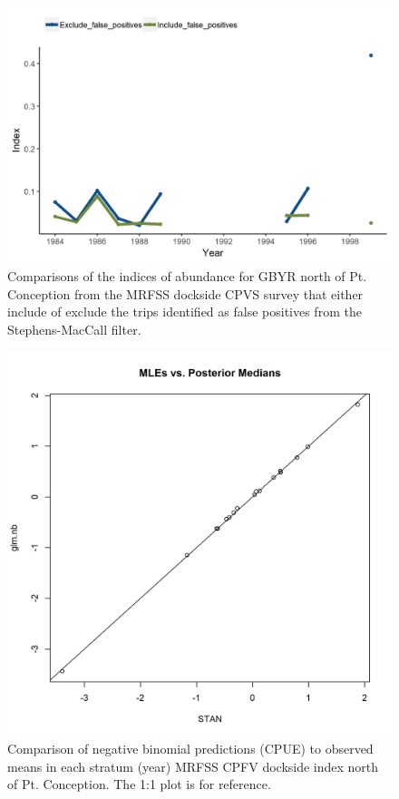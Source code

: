 \documentclass[12pt,]{article}
\begin{document}
\begin{figure}
\centering
\includegraphics{Figures/MRFSS_index_N_SM_falsepos.png}
\caption{Comparisons of the indices of abundance for GBYR north of Pt.
Conception from the MRFSS dockside CPVS survey that either include of
exclude the trips identified as false positives from the
Stephens-MacCall filter. \label{fig:MRFSS_index_N_SM_falsepos}}
\end{figure}

\begin{figure}
\centering
\includegraphics{Figures/Fleet10_MLE_stan.png}
\caption{Comparison of negative binomial predictions (CPUE) to observed
means in each stratum (year) MRFSS CPFV dockside index north of Pt.
Conception. The 1:1 plot is for reference. \label{fig:Fleet10_MLE_stan}}
\end{figure}
\end{document}
